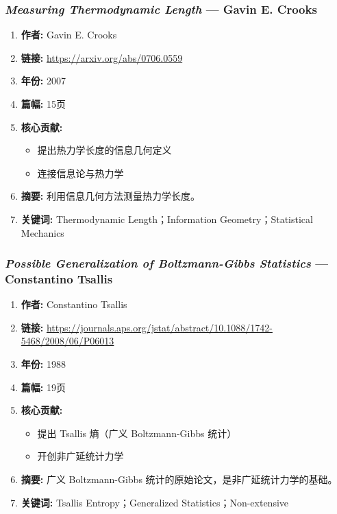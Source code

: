 \subsubsection{\textbf{\textit{Measuring Thermodynamic Length}} — Gavin E. Crooks}
\begin{enumerate}
    \item \textbf{作者:} Gavin E. Crooks
    \item \textbf{链接:} \url{https://arxiv.org/abs/0706.0559}
    \item \textbf{年份:} 2007
    \item \textbf{篇幅:} 15页
    \item \textbf{核心贡献:}
        \begin{itemize}
            \item 提出热力学长度的信息几何定义
            \item 连接信息论与热力学
        \end{itemize}
    \item \textbf{摘要:} 利用信息几何方法测量热力学长度。
    \item \textbf{关键词:} Thermodynamic Length；Information Geometry；Statistical Mechanics
\end{enumerate}

\subsubsection{\textbf{\textit{Possible Generalization of Boltzmann-Gibbs Statistics}} — Constantino Tsallis}
\begin{enumerate}
    \item \textbf{作者:} Constantino Tsallis
    \item \textbf{链接:} \url{https://journals.aps.org/jstat/abstract/10.1088/1742-5468/2008/06/P06013}
    \item \textbf{年份:} 1988
    \item \textbf{篇幅:} 19页
    \item \textbf{核心贡献:}
        \begin{itemize}
            \item 提出 Tsallis 熵（广义 Boltzmann-Gibbs 统计）
            \item 开创非广延统计力学
        \end{itemize}
    \item \textbf{摘要:} 广义 Boltzmann-Gibbs 统计的原始论文，是非广延统计力学的基础。
    \item \textbf{关键词:} Tsallis Entropy；Generalized Statistics；Non-extensive
\end{enumerate}

